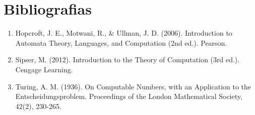 \chapter{Bibliografias}
\begin{enumerate}
    \item Hopcroft, J. E., Motwani, R., & Ullman, J. D. (2006). Introduction to Automata Theory, Languages, and Computation (2nd ed.). Pearson.\newline
    \item Sipser, M. (2012). Introduction to the Theory of Computation (3rd ed.). Cengage Learning.\newline
    \item Turing, A. M. (1936). On Computable Numbers, with an Application to the Entscheidungsproblem. Proceedings of the London Mathematical Society, 42(2), 230-265.\newline
\end{enumerate}




